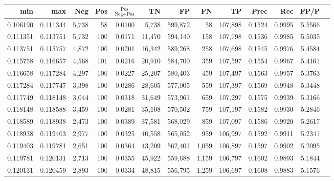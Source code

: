 \begin{tabular}{rrrrrrrrrrrrr}
\toprule
     min &      max &   Neg & Pos & $\frac{\text{Pos}}{\text{Neg}+\text{Pos}}$ &      TN &      FP &      FN &      TP &   Prec &    Rec &   FP/P \\
\midrule
0.106190 & 0.111344 & 5,738 &  58 &                                     0.0100 &   5,738 & 599,872 &      58 & 107,898 & 0.1524 & 0.9995 & 5.5566 \\
0.111351 & 0.113751 & 5,732 & 100 &                                     0.0171 &  11,470 & 594,140 &     158 & 107,798 & 0.1536 & 0.9985 & 5.5035 \\
0.113751 & 0.115757 & 4,872 & 100 &                                     0.0201 &  16,342 & 589,268 &     258 & 107,698 & 0.1545 & 0.9976 & 5.4584 \\
0.115758 & 0.116657 & 4,568 & 101 &                                     0.0216 &  20,910 & 584,700 &     359 & 107,597 & 0.1554 & 0.9967 & 5.4161 \\
0.116658 & 0.117284 & 4,297 & 100 &                                     0.0227 &  25,207 & 580,403 &     459 & 107,497 & 0.1563 & 0.9957 & 5.3763 \\
0.117284 & 0.117747 & 3,398 & 100 &                                     0.0286 &  28,605 & 577,005 &     559 & 107,397 & 0.1569 & 0.9948 & 5.3448 \\
0.117749 & 0.118148 & 3,044 & 100 &                                     0.0318 &  31,649 & 573,961 &     659 & 107,297 & 0.1575 & 0.9939 & 5.3166 \\
0.118148 & 0.118588 & 3,459 & 100 &                                     0.0281 &  35,108 & 570,502 &     759 & 107,197 & 0.1582 & 0.9930 & 5.2846 \\
0.118589 & 0.118938 & 2,473 & 100 &                                     0.0389 &  37,581 & 568,029 &     859 & 107,097 & 0.1586 & 0.9920 & 5.2617 \\
0.118938 & 0.119403 & 2,977 & 100 &                                     0.0325 &  40,558 & 565,052 &     959 & 106,997 & 0.1592 & 0.9911 & 5.2341 \\
0.119403 & 0.119781 & 2,651 & 100 &                                     0.0364 &  43,209 & 562,401 &   1,059 & 106,897 & 0.1597 & 0.9902 & 5.2095 \\
0.119781 & 0.120131 & 2,713 & 100 &                                     0.0355 &  45,922 & 559,688 &   1,159 & 106,797 & 0.1602 & 0.9893 & 5.1844 \\
0.120131 & 0.120459 & 2,893 & 100 &                                     0.0334 &  48,815 & 556,795 &   1,259 & 106,697 & 0.1608 & 0.9883 & 5.1576 \\

\end{tabular}
